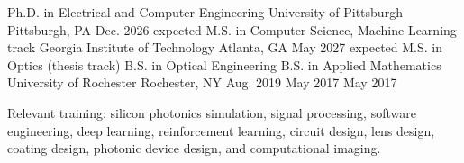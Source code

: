 

\begin{cventries}
  \cventry
    {Ph.D. in Electrical and Computer Engineering} %
    {University of Pittsburgh} %
    {Pittsburgh, PA} %
    {Dec. 2026 expected} %
    {
    }
\vspace{-0.4cm}
  \cventry
    {M.S. in Computer Science, Machine Learning track} %
    {Georgia Institute of Technology} %
    {Atlanta, GA} %
    {May 2027 expected} %
    {
    }
\vspace{-0.4cm}
  \cventry
    {M.S. in Optics (thesis track) \linebreak B.S. in Optical Engineering \linebreak B.S. in Applied Mathematics} %
    {University of Rochester } %
    {Rochester, NY} %
    {Aug. 2019 \linebreak May 2017 \linebreak May 2017} %
    {
    \begin{cvitems} 
        \item {Relevant training: silicon photonics simulation, signal processing, software engineering, deep learning, reinforcement learning, circuit design, lens design, coating design, photonic device design, and computational imaging.}
    \end{cvitems}
    }
\vspace{-0.5cm}
\end{cventries}

